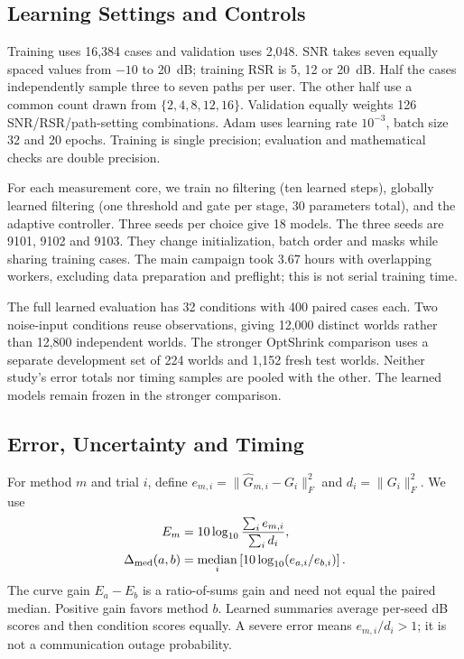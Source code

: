 \documentclass[10pt,journal,letterpaper]{IEEEtran}
\DeclareMathOperator{\median}{median}
\begin{document}
\subsection{Learning Settings and Controls}
Training uses 16,384 cases and validation uses 2,048. SNR takes seven equally spaced values from $-10$ to 20~dB; training RSR is 5, 12 or 20~dB. Half the cases independently sample three to seven paths per user. The other half use a common count drawn from $\{2,4,8,12,16\}$. Validation equally weights 126 SNR/RSR/path-setting combinations. Adam uses learning rate $10^{-3}$, batch size 32 and 20 epochs. Training is single precision; evaluation and mathematical checks are double precision.

For each measurement core, we train no filtering (ten learned steps), globally learned filtering (one threshold and gate per stage, 30 parameters total), and the adaptive controller. Three seeds per choice give 18 models. The three seeds are 9101, 9102 and 9103. They change initialization, batch order and masks while sharing training cases. The main campaign took 3.67 hours with overlapping workers, excluding data preparation and preflight; this is not serial training time.

The full learned evaluation has 32 conditions with 400 paired cases each. Two noise-input conditions reuse observations, giving 12,000 distinct worlds rather than 12,800 independent worlds. The stronger OptShrink comparison uses a separate development set of 224 worlds and 1,152 fresh test worlds. Neither study's error totals nor timing samples are pooled with the other. The learned models remain frozen in the stronger comparison.

\subsection{Error, Uncertainty and Timing}
For method $m$ and trial $i$, define $e_{m,i}=\|\widehat G_{m,i}-G_i\|_F^2$ and $d_i=\|G_i\|_F^2$. We use
\begin{align}
 E_m&=10\log_{10}\frac{\sum_i e_{m,i}}{\sum_i d_i},\label{eq:nmse}\\
 \Delta_{\rm med}(a,b)&=\median_i\left[10\log_{10}(e_{a,i}/e_{b,i})\right].
\end{align}
The curve gain $E_a-E_b$ is a ratio-of-sums gain and need not equal the paired median. Positive gain favors method $b$. Learned summaries average per-seed dB scores and then condition scores equally. A severe error means $e_{m,i}/d_i>1$; it is not a communication outage probability.
\end{document}
